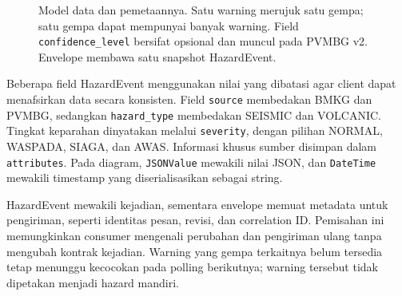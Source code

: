 \begin{figure}[h]
{%
}
\caption{Model data dan pemetaannya. Satu warning merujuk satu gempa; satu gempa dapat mempunyai banyak warning. Field \texttt{confidence\_level} bersifat opsional dan muncul pada PVMBG v2. Envelope membawa satu snapshot HazardEvent.}
\label{fig:domain-model}
\end{figure}

Beberapa field HazardEvent menggunakan nilai yang dibatasi agar client dapat menafsirkan data secara konsisten. Field \texttt{source} membedakan BMKG dan PVMBG, sedangkan \texttt{hazard\_type} membedakan SEISMIC dan VOLCANIC. Tingkat keparahan dinyatakan melalui \texttt{severity}, dengan pilihan NORMAL, WASPADA, SIAGA, dan AWAS. Informasi khusus sumber disimpan dalam \texttt{attributes}. Pada diagram, \texttt{JSONValue} mewakili nilai JSON, dan \texttt{DateTime} mewakili timestamp yang diserialisasikan sebagai string.

HazardEvent mewakili kejadian, sementara envelope memuat metadata untuk pengiriman, seperti identitas pesan, revisi, dan correlation ID. Pemisahan ini memungkinkan consumer mengenali perubahan dan pengiriman ulang tanpa mengubah kontrak kejadian. Warning yang gempa terkaitnya belum tersedia tetap menunggu kecocokan pada polling berikutnya; warning tersebut tidak dipetakan menjadi hazard mandiri.


